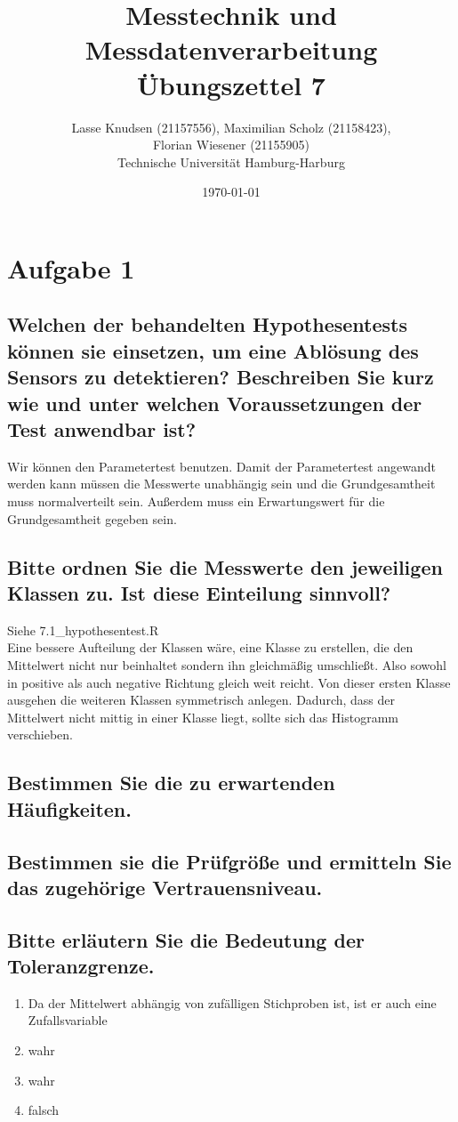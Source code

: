 \documentclass[12pt, a4paper, titlepage]{article}
\title{Messtechnik und Messdatenverarbeitung \\ \"Ubungszettel 7}
\author{Lasse Knudsen (21157556), Maximilian Scholz (21158423), \\
	Florian Wiesener (21155905)  \\
	Technische Universit\"at Hamburg-Harburg \\
}
\date{\today}
\begin{document}
	\maketitle
	 \section{Aufgabe 1}
	 \label{sec:a1}
	 
	\subsection{Welchen der behandelten Hypothesentests k\"onnen sie einsetzen, um eine Abl\"osung des Sensors zu
	 	detektieren? Beschreiben Sie kurz wie und unter welchen Voraussetzungen der Test anwendbar ist?}
	Wir k\"onnen den Parametertest benutzen. Damit der Parametertest angewandt werden kann m\"ussen die Messwerte unabh\"angig sein und die Grundgesamtheit muss normalverteilt sein. Au\ss erdem muss ein Erwartungswert f\"ur die Grundgesamtheit gegeben sein.
	
	\subsection{Bitte ordnen Sie die Messwerte den jeweiligen Klassen zu. Ist diese Einteilung sinnvoll?}
	Siehe 7.1_hypothesentest.R \\
	Eine bessere Aufteilung der Klassen w\"are, eine Klasse zu erstellen, die den Mittelwert nicht nur beinhaltet sondern ihn gleichmä\ss ig umschlie\ss t. Also sowohl in positive als auch negative Richtung gleich weit reicht. Von dieser ersten Klasse ausgehen die weiteren Klassen symmetrisch anlegen. Dadurch, dass der Mittelwert nicht mittig in einer Klasse liegt, sollte sich das Histogramm verschieben.
	
	\subsection{Bestimmen Sie die zu erwartenden H\"aufigkeiten.}
	
	
	\subsection{Bestimmen sie die Pr\"ufgr\"o\ss e und ermitteln Sie das zugehörige Vertrauensniveau.}
	


	

	\subsection{Bitte erl\"autern Sie die Bedeutung der Toleranzgrenze.}
	\begin{enumerate}
		\item Da der Mittelwert abh\"angig von zuf\"alligen Stichproben ist, ist er auch eine Zufallsvariable
		\item wahr
		\item wahr
		\item falsch
	\end{enumerate}
	
\end{document}
